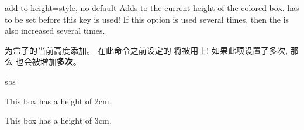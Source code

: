
\begin{docTcbKey}[][doc new=2014-11-07]{add to height}{=}{style, no default}
Adds  to the current height of the colored box.
 has to be set before this key is used!
If this option is used several times, then the  is
also increased several times.

为盒子的当前高度添加。%
在此命令之前设定的  将被用上!%
如果此项设置了多次, 那么  也会被增加{\bf 多次}。
\begin{dispExample*}{sbs}

\begin{tcolorbox}
This box has a height of 2cm.
\end{tcolorbox}
\begin{tcolorbox}[add to height=1cm]
This box has a height of 3cm.
\end{tcolorbox}
\end{dispExample*}
\end{docTcbKey}
